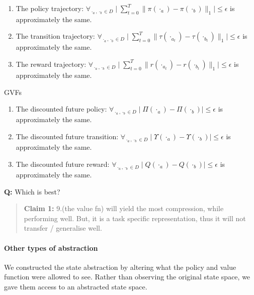 \begin{enumerate}
\def\labelenumi{\arabic{enumi}.}
\setcounter{enumi}{3}
\tightlist
\item
  The policy trajectory:
  \(\forall_{\cdot_a, \cdot_b \in D} \mid \sum_{t=0}^T \parallel \pi(\cdot_a) - \pi(\cdot_b)\parallel_1 \mid \le \epsilon\)
  is approximately the same.
\item
  The transition trajectory:
  \(\forall_{\cdot_a, \cdot_b \in D} \mid \sum_{t=0}^T\parallel \tau(\cdot_{a_t}) - \tau(\cdot_{b_t})\parallel_1\mid \le \epsilon\)
  is approximately the same.
\item
  The reward trajectory:
  \(\forall_{\cdot_a, \cdot_b \in D} \mid \sum_{t=0}^T \parallel r(\cdot_{a_t}) - r(\cdot_{b_t})\parallel_1 \mid \le \epsilon\)
  is approximately the same.
\end{enumerate}

GVFs

\begin{enumerate}
\def\labelenumi{\arabic{enumi}.}
\setcounter{enumi}{6}
\tightlist
\item
  The discounted future policy:
  \(\forall_{\cdot_a, \cdot_b \in D} \mid \Pi(\cdot_a) - \Pi(\cdot_b)\mid \le \epsilon\)
  is approximately the same.
\item
  The discounted future transition:
  \(\forall_{\cdot_a, \cdot_b \in D} \mid \Upsilon(\cdot_a) - \Upsilon (\cdot_b)\mid \le \epsilon\)
  is approximately the same.
\item
  The discounted future reward:
  \(\forall_{\cdot_a, \cdot_b \in D} \mid Q(\cdot_a) - Q(\cdot_b)\mid \le \epsilon\)
  is approximately the same.
\end{enumerate}

\textbf{Q:} Which is best?

\begin{quote}
\textbf{Claim 1:} 9.(the value fn) will yield the most compression,
while performing well. But, it is a task specific representation, thus
it will not transfer / generalise well.
\end{quote}

\hypertarget{other-types-of-abstraction}{%
\paragraph{Other types of
abstraction}\label{other-types-of-abstraction}}

We constructed the state abstraction by altering what the policy and
value function were allowed to see. Rather than observing the original
state space, we gave them access to an abstracted state space.

